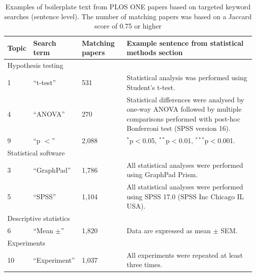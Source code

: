 \documentclass[12pt]{article}
\begin{document}
\begin{landscape}
\begin{table}

\caption{\label{tab:plos-example-boilerplate-sentence} Examples of boilerplate text from PLOS ONE papers based on targeted keyword searches (sentence level). The number of matching papers was based on a Jaccard score of 0.75 or higher}
\centering
\begin{tabular}[t]{p{}p{}p{}p{}}
\hline
Topic & Search term &  Matching papers &  Example sentence from statistical methods section\\
\hline
\multicolumn{4}{l}{Hypothesis testing}\\
\hline
1 & ``t-test'' & 531 & Statistical analysis was performed using Student's t-test.\\
4 & ``ANOVA'' & 270 & Statistical differences were analysed by one-way ANOVA followed by multiple comparisons performed with post-hoc Bonferroni test (SPSS version 16).\\
9 & ``p $<$'' & 2,088 & $^{*}$p$<$0.05, $^{**}$p$<$0.01, $^{***}$p$<$0.001.\\
\hline
\multicolumn{4}{l}{Statistical software}\\
\hline
3 & ``GraphPad'' &1,786  & All statistical analyses were performed using GraphPad Prism.\\
5 & ``SPSS'' & 1,104 & All statistical analyses were performed using SPSS 17.0 (SPSS Inc Chicago IL USA).\\
\hline
\multicolumn{4}{l}{Descriptive statistics}\\
\hline
6 & ``Mean $\pm$'' & 1,820 & Data are expressed as mean $\pm$ SEM.\\
\hline
\multicolumn{4}{l}{Experiments}\\
\hline
10 & ``Experiment'' & 1,037 & All experiments were repeated at least three times.\\
\hline
\end{tabular}
\end{table}
\end{landscape}

\pagebreak

%
\end{document}
